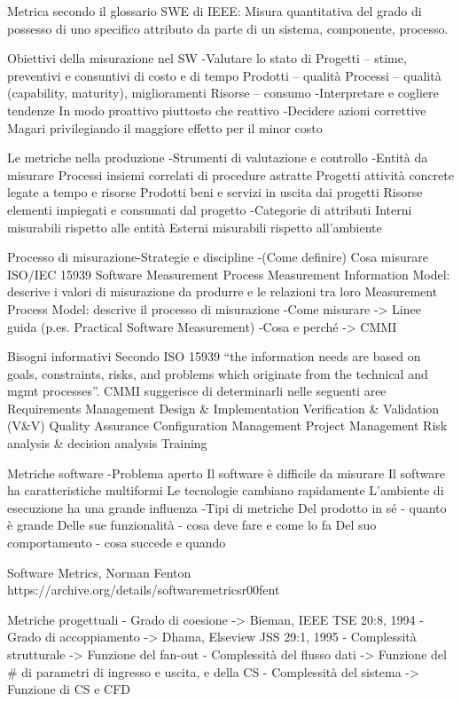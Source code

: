 \documentclass{report}
\begin{document}
Metrica secondo il glossario SWE di IEEE: Misura quantitativa del grado di possesso di uno specifico attributo da parte di un sistema, componente, processo.

Obiettivi della misurazione nel SW
-Valutare lo stato di
 Progetti – stime, preventivi e consuntivi di costo e di tempo
 Prodotti – qualità
 Processi – qualità (capability, maturity), miglioramenti
 Risorse – consumo
-Interpretare e cogliere tendenze
 In modo proattivo piuttosto che reattivo
-Decidere azioni correttive
 Magari privilegiando il maggiore effetto per il minor costo

Le metriche nella produzione
-Strumenti di valutazione e controllo
-Entità da misurare
 Processi insiemi correlati di procedure astratte
 Progetti attività concrete legate a tempo e risorse
 Prodotti beni e servizi in uscita dai progetti
 Risorse elementi impiegati e consumati dal progetto
-Categorie di attributi
 Interni misurabili rispetto alle entità
 Esterni misurabili rispetto all’ambiente

Processo di misurazione-Strategie e discipline
-(Come definire) Cosa misurare
ISO/IEC 15939 Software Measurement Process
Measurement Information Model: descrive i valori di misurazione da
produrre e le relazioni tra loro
Measurement Process Model: descrive il processo di misurazione
-Come misurare -> Linee guida (p.es. Practical Software Measurement)
-Cosa e perché -> CMMI

Bisogni informativi
Secondo ISO 15939 “the information needs are based on goals, constraints, risks, and problems which originate from the technical and mgmt processes”.
CMMI suggerisce di determinarli nelle seguenti aree
 Requirements Management
 Design \& Implementation
 Verification \& Validation (V\&V)
 Quality Assurance
 Configuration Management
 Project Management
 Risk analysis \& decision analysis
 Training

Metriche software
-Problema aperto
 Il software è difficile da misurare
 Il software ha caratteristiche multiformi
 Le tecnologie cambiano rapidamente
 L’ambiente di esecuzione ha una grande influenza
-Tipi di metriche
 Del prodotto in sé - quanto è grande
 Delle sue funzionalità - cosa deve fare e come lo fa
 Del suo comportamento - cosa succede e quando

Software Metrics, Norman Fenton https://archive.org/details/softwaremetricsr00fent

Metriche progettuali
- Grado di coesione -> Bieman, IEEE TSE 20:8, 1994
- Grado di accoppiamento -> Dhama, Elseview JSS 29:1, 1995
- Complessità strutturale -> Funzione del fan-out
- Complessità del flusso dati -> Funzione del \# di parametri di ingresso e uscita, e della CS
- Complessità del sistema -> Funzione di CS e CFD
\end{document}
